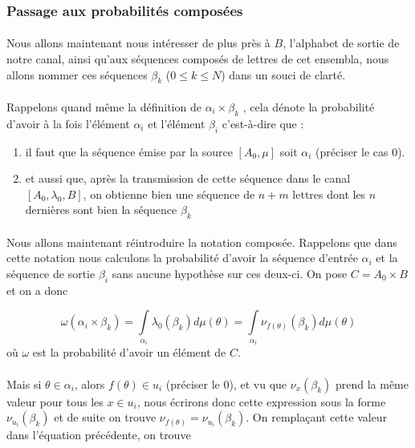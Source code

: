 \subsubsection*{Passage aux probabilités composées}
	
	\paragraph{}
	Nous allons maintenant nous intéresser de plus près à $B$, l'alphabet de sortie de notre canal, ainsi qu'aux séquences
	composés de lettres de cet ensembla, nous allons nommer ces séquences $\beta_k$ ($0 \le k \le N$) dans un souci de clarté.
	
	\paragraph{}
	Rappelons quand même la définition de $\alpha_i \times \beta_k$ , cela dénote la probabilité d'avoir à la fois l'élément $\alpha_i$ et l'élément $\beta_i$ c'est-à-dire que :
	\begin{enumerate}
		\item il faut que la séquence émise par la source $[A_0,\mu]$ soit $\alpha_i$ (préciser le cas 0).
		\item et aussi que, après la transmission de cette séquence dans le canal $[A_0,\lambda_0,B]$, on obtienne bien une séquence de $n+m$ lettres dont les $n$ 
		dernières sont bien la séquence $\beta_k$
	\end{enumerate} 
	
	\paragraph{}
	Nous allons maintenant réintroduire la notation composée. Rappelons que dans cette notation nous calculons la probabilité d'avoir la séquence
	d'entrée $\alpha_i$ et la séquence de sortie $\beta_i$ sans aucune hypothèse sur ces deux-ci. On pose $C = A_0 \times B$ et on a donc
	
	
	\[\omega(\alpha_i\times\beta_k)=\int\limits_{\alpha_i}\lambda_0(\beta_k)d\mu(\theta)=\int\limits_{\alpha_i}\nu_{f(\theta)}(\beta_k)d\mu(\theta)\]
	où $\omega$ est la probabilité d'avoir un élément de $C$.
	
	\paragraph{}
	Mais si $\theta \in \alpha_i$, alors $f(\theta) \in u_i$ (préciser le 0), et vu que $\nu_x(\beta_k)$ prend la même valeur
	pour tous les $x \in u_i$, nous écrirons donc cette expression sous la forme $\nu_{u_i}(\beta_k)$ et de suite on trouve $\nu_{f(\theta)}=\nu_{u_i}(\beta_k)$.
	On remplaçant cette valeur dans l'équation précédente, on trouve
	

